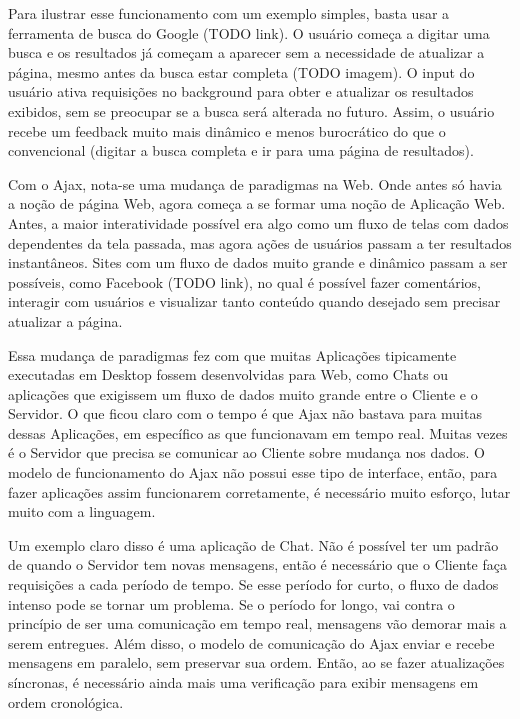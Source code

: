 \documentclass[a4paper,12pt]{article}
\begin{document}
Para ilustrar esse funcionamento com um exemplo simples, basta usar a ferramenta de busca do Google (TODO link). O usuário começa a digitar uma busca e os resultados já começam a aparecer sem a necessidade de atualizar a página, mesmo antes da busca estar completa (TODO imagem). O input do usuário ativa requisições no background para obter e atualizar os resultados exibidos, sem se preocupar se a busca será alterada no futuro. Assim, o usuário recebe um feedback muito mais dinâmico e menos burocrático do que o convencional (digitar a busca completa e ir para uma página de resultados).

Com o Ajax, nota-se uma mudança de paradigmas na Web. Onde antes só havia a noção de página Web, agora começa a se formar uma noção de Aplicação Web. Antes, a maior interatividade possível era algo como um fluxo de telas com dados dependentes da tela passada, mas agora ações de usuários passam a ter resultados instantâneos. Sites com um fluxo de dados muito grande e dinâmico passam a ser possíveis, como Facebook (TODO link), no qual é possível fazer comentários, interagir com usuários e visualizar tanto conteúdo quando desejado sem precisar atualizar a página.

Essa mudança de paradigmas fez com que muitas Aplicações tipicamente executadas em Desktop fossem desenvolvidas para Web, como Chats ou aplicações que exigissem um fluxo de dados muito grande entre o Cliente e o Servidor. O que ficou claro com o tempo é que Ajax não bastava para muitas dessas Aplicações, em específico as que funcionavam em tempo real. Muitas vezes é o Servidor que precisa se comunicar ao Cliente sobre mudança nos dados. O modelo de funcionamento do Ajax não possui esse tipo de interface, então, para fazer aplicações assim funcionarem corretamente, é necessário muito esforço, lutar muito com a linguagem.

Um exemplo claro disso é uma aplicação de Chat. Não é possível ter um padrão de quando o Servidor tem novas mensagens, então é necessário que o Cliente faça requisições a cada período de tempo. Se esse período for curto, o fluxo de dados intenso pode se tornar um problema. Se o período for longo, vai contra o princípio de ser uma comunicação em tempo real, mensagens vão demorar mais a serem entregues. Além disso, o modelo de comunicação do Ajax enviar e recebe mensagens em paralelo, sem preservar sua ordem. Então, ao se fazer atualizações síncronas, é necessário ainda mais uma verificação para exibir mensagens em ordem cronológica.
\end{document}
